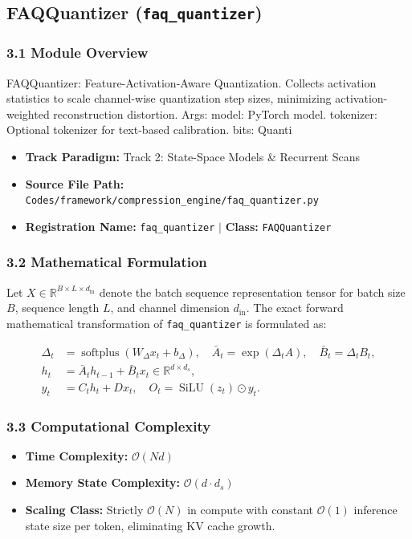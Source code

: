 \subsection{FAQQuantizer (\texttt{faq\_quantizer})}
\label{sec:app_module_faq_quantizer}

\subsubsection*{3.1 Module Overview}
FAQQuantizer: Feature-Activation-Aware Quantization. Collects activation statistics to scale channel-wise quantization step sizes, minimizing activation-weighted reconstruction distortion.  Args:     model: PyTorch model.     tokenizer: Optional tokenizer for text-based calibration.     bits: Quanti
\begin{itemize}
    \item \textbf{Track Paradigm:} Track 2: State-Space Models & Recurrent Scans
    \item \textbf{Source File Path:} \texttt{Codes/framework/compression\_engine/faq\_quantizer.py}
    \item \textbf{Registration Name:} \texttt{faq\_quantizer} $\mid$ \textbf{Class:} \texttt{FAQQuantizer}
\end{itemize}

\subsubsection*{3.2 Mathematical Formulation}
Let $X \in \mathbb{R}^{B \times L \times d_{\text{in}}}$ denote the batch sequence representation tensor for batch size $B$, sequence length $L$, and channel dimension $d_{\text{in}}$. The exact forward mathematical transformation of \texttt{faq\_quantizer} is formulated as:

\begin{align}
\Delta_t &= \operatorname{softplus}(W_\Delta x_t + b_\Delta), \quad \bar{A}_t = \exp(\Delta_t A), \quad \bar{B}_t = \Delta_t B_t, \\
h_t &= \bar{A}_t h_{t-1} + \bar{B}_t x_t \in \mathbb{R}^{d \times d_s}, \\
y_t &= C_t h_t + D x_t, \quad O_t = \operatorname{SiLU}(z_t) \odot y_t.
\end{align}


\subsubsection*{3.3 Computational Complexity}
\begin{itemize}
    \item \textbf{Time Complexity:} $\mathcal{O}(N d)$
    \item \textbf{Memory State Complexity:} $\mathcal{O}(d \cdot d_s)$
    \item \textbf{Scaling Class:} Strictly $\mathcal{O}(N)$ in compute with constant $\mathcal{O}(1)$ inference state size per token, eliminating KV cache growth.
\end{itemize}

